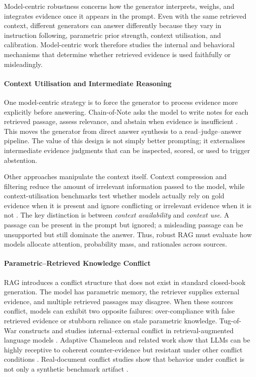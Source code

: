 
Model-centric robustness concerns how the generator interprets, weighs, and integrates evidence once it appears in the prompt. Even with the same retrieved context, different generators can answer differently because they vary in instruction following, parametric prior strength, context utilisation, and calibration. Model-centric work therefore studies the internal and behavioral mechanisms that determine whether retrieved evidence is used faithfully or misleadingly.



\paragraph{Context Utilisation and Intermediate Reasoning}

One model-centric strategy is to force the generator to process evidence more explicitly before answering. Chain-of-Note asks the model to write notes for each retrieved passage, assess relevance, and abstain when evidence is insufficient \citep{chainOfNote2023}. This moves the generator from direct answer synthesis to a read--judge--answer pipeline. The value of this design is not simply better prompting; it externalises intermediate evidence judgments that can be inspected, scored, or used to trigger abstention.

Other approaches manipulate the context itself. Context compression and filtering reduce the amount of irrelevant information passed to the model, while context-utilisation benchmarks test whether models actually rely on gold evidence when it is present and ignore conflicting or irrelevant evidence when it is not \citep{rrag032}. The key distinction is between \emph{context availability} and \emph{context use}. A passage can be present in the prompt but ignored; a misleading passage can be unsupported but still dominate the answer. Thus, robust RAG must evaluate how models allocate attention, probability mass, and rationales across sources.

\paragraph{Parametric--Retrieved Knowledge Conflict}

RAG introduces a conflict structure that does not exist in standard closed-book generation. The model has parametric memory, the retriever supplies external evidence, and multiple retrieved passages may disagree. When these sources conflict, models can exhibit two opposite failures: over-compliance with false retrieved evidence or stubborn reliance on stale parametric knowledge. Tug-of-War constructs and studies internal--external conflict in retrieval-augmented language models \citep{tugOfWar2024}. Adaptive Chameleon and related work show that LLMs can be highly receptive to coherent counter-evidence but resistant under other conflict conditions \citep{rrag046}. Real-document conflict studies show that behavior under conflict is not only a synthetic benchmark artifact \citep{rrag112}.


